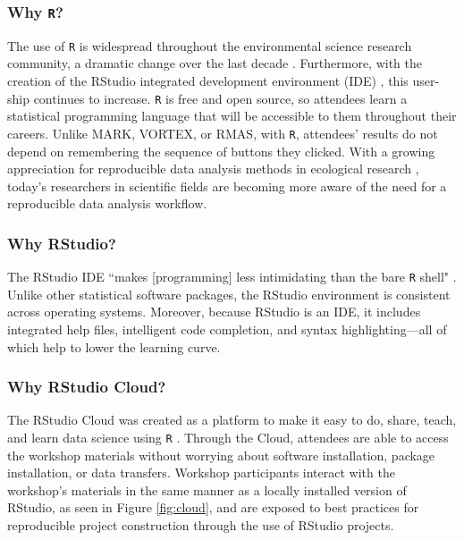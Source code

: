 \documentclass[12pt]{article}
\begin{document}
\subsubsection{Why \texttt{R}?} 

\noindent The use of \texttt{R} is widespread throughout the environmental science
research community, a dramatic change over the last decade \citep{Rpopular}. 
Furthermore, with the creation of the RStudio integrated development 
environment (IDE) \citep{rstudio}, this user-ship continues to increase. 
\texttt{R} is free and open source, so attendees learn a statistical
programming language that will be accessible to them throughout their careers.
Unlike MARK, VORTEX, or RMAS, with \texttt{R}, attendees' results do not depend
on remembering the sequence of buttons they clicked. With a growing appreciation
for reproducible data analysis methods in ecological research 
\citep{reproducibilty-comment, repeatability, pva, reproducibility_ecology},
today's researchers in scientific fields are becoming more aware of the need for
a reproducible data analysis workflow. 

\subsubsection{Why RStudio?}

\noindent The RStudio IDE ``makes [programming] less
intimidating than the bare \texttt{R} shell" \citep[p.\ 59]{mine}. Unlike other 
statistical software packages, the RStudio environment is consistent across
operating systems. Moreover, because RStudio is an IDE, it includes integrated
help files, intelligent code completion, and syntax highlighting---all of which
help to lower the learning curve. 

\subsubsection{Why RStudio Cloud?} 

\noindent The RStudio Cloud was created as a platform to make it easy to do,
share, teach, and learn data science using \texttt{R} \citep{RStudioCloud}. 
Through the Cloud, attendees are able to access the workshop materials without
worrying about software installation, package installation, or data transfers.
Workshop participants interact with the workshop's materials in the same manner
as a locally installed version of RStudio, as seen in Figure \ref{fig:cloud},
and are exposed to best practices for reproducible project construction through 
the use of RStudio projects. 
\end{document}
